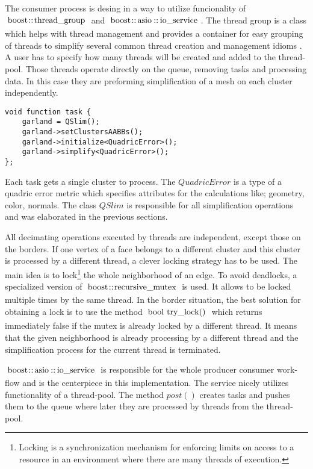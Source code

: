 The consumer process is desing in a way to utilize funcionality of $\inlinecode{Java}{boost::thread_group}$ and $\inlinecode{Java}{boost::asio::io_service}$. The thread group is a class which helps with thread management and provides a container for easy grouping of threads to simplify several common thread creation and management idioms \cite{boost03}. A user has to specify how many threads will be created and added to the thread-pool. Those threads operate directly on the queue, removing tasks and processing data. In this case they are preforming simplification of a mesh on each cluster independently.
\newline
\begin{center}
\begin{lstlisting}[caption={C style psuedocode of a task for a consumer.},captionpos=b]
void function task {
    garland = QSlim();
    garland->setClustersAABBs();
    garland->initialize<QuadricError>();
    garland->simplify<QuadricError>();
};
\end{lstlisting}
\end{center}

Each task gets a single cluster to process. The $QuadricError$ is a type of a quadric error metric which specifies attributes for the calculations like; geometry, color, normals. The class $QSlim$ is responsible for all simplification operations and was elaborated in the previous sections.

All decimating operations executed by threads are independent, except those on the borders. If one vertex of a face belongs to a different cluster and this cluster is processed by a different thread, a clever locking strategy has to be used. The main idea is to lock\footnote{Locking is a synchronization mechanism for enforcing limits on access to a resource in an environment where there are many threads of execution.} the whole neighborhood of an edge. To avoid deadlocks, a specialized version of $\inlinecode{Java}{boost::recursive_mutex}$ is used. It allows to be locked multiple times by the same thread. In the border situation, the best solution for obtaining a lock is to use the method $\inlinecode{Java}{bool try_lock()}$ which returns immediately false if the mutex is already locked by a different thread. It means that the given neighborhood is already processing by a different thread and the simplification process for the current thread is terminated.

$\inlinecode{Java}{boost::asio::io_service}$ is responsible for the whole producer consumer work-flow and is the centerpiece in this implementation. The service nicely utilizes functionality of a thread-pool. The method $post()$ creates tasks and pushes them to the queue where later they are processed by threads from the thread-pool.


